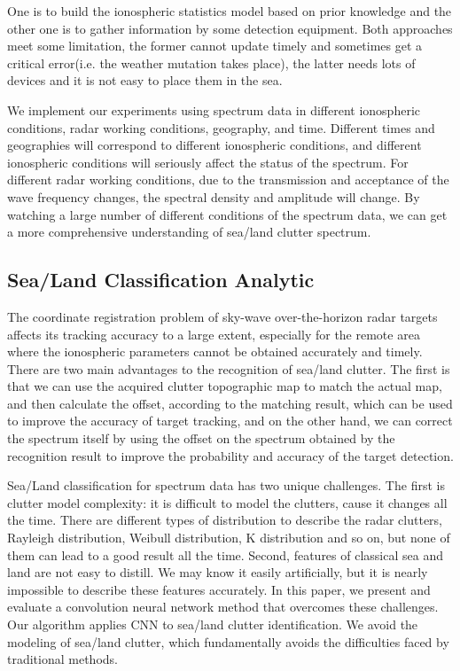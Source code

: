 One is to build the ionospheric statistics model based on prior knowledge and the other one is to gather information by some detection equipment. Both approaches meet some limitation, the former cannot update timely and sometimes get a critical error(i.e. the weather mutation takes place), the latter needs lots of devices and it is not easy to place them in the sea.

We implement our experiments using spectrum data in different ionospheric conditions, radar working conditions, geography, and time. Different times and geographies will correspond to different ionospheric conditions, and different ionospheric conditions will seriously affect the status of the spectrum. For different radar working conditions, due to the transmission and acceptance of the wave frequency changes, the spectral density and amplitude will change. By watching a large number of different conditions of the spectrum data, we can get a more comprehensive understanding of sea/land clutter spectrum.

\subsection{Sea/Land Classification Analytic}
The coordinate registration problem of sky-wave over-the-horizon radar targets affects its tracking accuracy to a large extent, especially for the remote area where the ionospheric parameters cannot be obtained accurately and timely. There are two main advantages to the recognition of sea/land clutter. The first is that we can use the acquired clutter topographic map to match the actual map, and then calculate the offset, according to the matching result, which can be used to improve the accuracy of target tracking, and on the other hand, we can correct the spectrum itself by using the offset on the spectrum obtained by the recognition result to improve the probability and accuracy of the target detection.

Sea/Land classification for spectrum data has two unique challenges. The first is clutter model complexity: it is difficult to model the clutters, cause it changes all the time. There are different types of distribution to describe the radar clutters, Rayleigh distribution, Weibull distribution, K distribution and so on, but none of them can lead to a good result all the time. Second, features of classical sea and land are not easy to distill. We may know it easily artificially, but it is nearly impossible to describe these features accurately. In this paper, we present and evaluate a convolution neural network method that overcomes these challenges. Our algorithm applies CNN to sea/land clutter identification. We avoid the modeling of sea/land clutter, which fundamentally avoids the difficulties faced by traditional methods.

